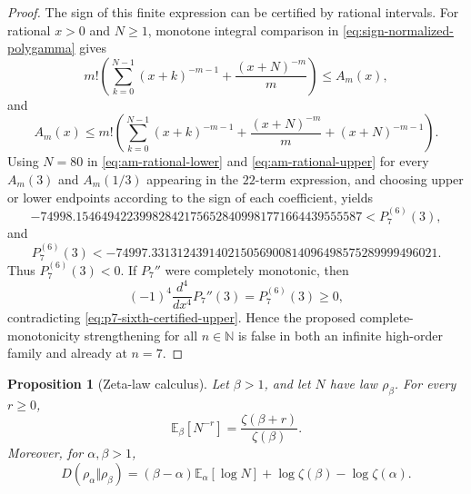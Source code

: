 \documentclass[11pt]{article}
\numberwithin{equation}{section}
\newtheorem{proposition}[theorem]{Proposition}
\theoremstyle{definition}
\theoremstyle{remark}
\newcommand{\E}{\mathbb E}
\newcommand{\N}{\mathbb N}
\newcommand{\1}{\mathbf 1}
\begin{document}
\begin{proof}
The sign of this finite expression can be certified by rational intervals.  For rational \(x>0\) and \(N\ge1\), monotone integral comparison in \eqref{eq:sign-normalized-polygamma} gives
\begin{equation}
\label{eq:am-rational-lower}
m!\left(\sum_{k=0}^{N-1}(x+k)^{-m-1}+\frac{(x+N)^{-m}}{m}\right)
\le A_m(x),
\end{equation}
and
\begin{equation}
\label{eq:am-rational-upper}
A_m(x)\le
m!\left(\sum_{k=0}^{N-1}(x+k)^{-m-1}+\frac{(x+N)^{-m}}{m}+(x+N)^{-m-1}\right).
\end{equation}
Using \(N=80\) in \eqref{eq:am-rational-lower} and \eqref{eq:am-rational-upper} for every \(A_m(3)\) and \(A_m(1/3)\) appearing in the \(22\)-term expression, and choosing upper or lower endpoints according to the sign of each coefficient, yields
\begin{equation}
\label{eq:p7-sixth-certified-lower}
-74998.154649422399828421756528409981771664439555587
<P_7^{(6)}(3),
\end{equation}
and
\begin{equation}
\label{eq:p7-sixth-certified-upper}
P_7^{(6)}(3)
<-74997.331312439140215056900814096498575289999496021.
\end{equation}
Thus \(P_7^{(6)}(3)<0\).  If \(P_7''\) were completely monotonic, then
\begin{equation}
\label{eq:p7-cm-required-sign}
(-1)^4\frac{d^4}{dx^4}P_7''(3)=P_7^{(6)}(3)\ge0,
\end{equation}
contradicting \eqref{eq:p7-sixth-certified-upper}.  Hence the proposed complete-monotonicity strengthening for all \(n\in\N\) is false in both an infinite high-order family and already at \(n=7\).
\end{proof}

\begin{proposition}[Zeta-law calculus]
\label{prop:zeta-law-calculus}
Let \(\beta>1\), and let \(N\) have law \(\rho_\beta\).  For every \(r\ge0\),
\begin{equation}
\label{eq:zeta-law-moment}
\E_\beta[N^{-r}]=\frac{\zeta(\beta+r)}{\zeta(\beta)}.
\end{equation}
Moreover, for \(\alpha,\beta>1\),
\begin{equation}
\label{eq:zeta-law-relative-entropy}
D(\rho_\alpha\Vert\rho_\beta)
=(\beta-\alpha)\E_\alpha[\log N]
+\log\zeta(\beta)-\log\zeta(\alpha).
\end{equation}
\end{proposition}
\end{document}
